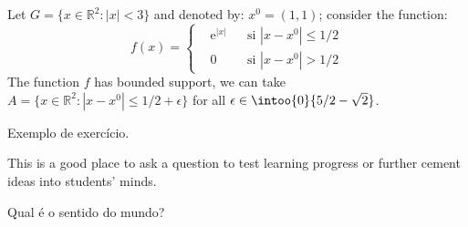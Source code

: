             \begin{example}
                Let $G=\{x\in\mathbb{R}^2:|x|<3\}$ and denoted by: $x^0=(1,1)$; consider the function:
                \begin{equation}
                    f(x)=\left\{\begin{aligned} & \mathrm{e}^{|x|} & & \text{si $|x-x^0|\leq 1/2$}\\
                    & 0 & & \text{si $|x-x^0|> 1/2$}\end{aligned}\right.
                \end{equation}
                The function $f$ has bounded support, we can take $A=\{x\in\mathbb{R}^2:|x-x^0|\leq 1/2+\epsilon\}$ for all $\epsilon\in\intoo{0}{5/2-\sqrt{2}}$.
            \end{example}
            \begin{example}
                \lipsum[2]
            \end{example}



        Exemplo de exercício.
        \begin{exercise}
            This is a good place to ask a question to test learning progress or further cement ideas into students' minds.
        \end{exercise}



        \begin{problem}
            Qual é o sentido do mundo?
        \end{problem}





